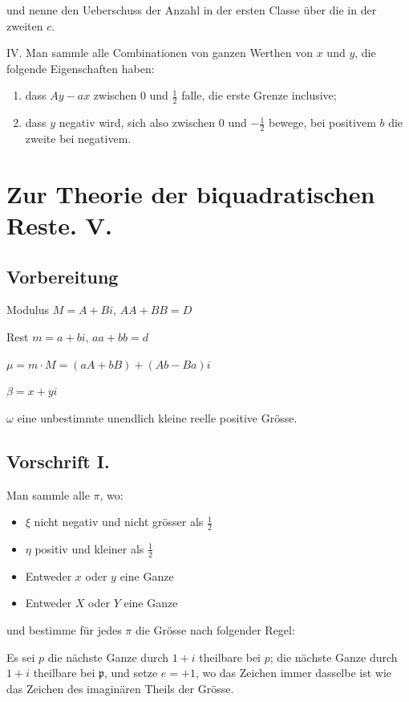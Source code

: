 \documentclass[12pt,a4paper]{article}
\begin{document}
und nenne den Ueberschuss der Anzahl in der ersten Classe über die in der zweiten $c$.

IV. Man sammle alle Combinationen von ganzen Werthen von $x$ und $y$, die folgende Eigenschaften haben:
\begin{enumerate}
\item dass $Ay - ax$ zwischen $0$ und $\frac{1}{2}$ falle, die erste Grenze inclusive;
\item dass $y$ negativ wird, sich also zwischen $0$ und $-\frac{1}{2}$ bewege, bei positivem $b$ die zweite bei negativem.
\end{enumerate}


\section*{Zur Theorie der biquadratischen Reste. V.}

\subsection*{Vorbereitung}

Modulus $M = A + Bi$, $AA + BB = D$

Rest $m = a + bi$, $aa + bb = d$

$\mu = m \cdot M = (aA + bB) + (Ab - Ba)i$

$\beta = x + yi$

$\omega$ eine unbestimmte unendlich kleine reelle positive Grösse.

\subsection*{Vorschrift I.}

Man sammle alle $\pi$, wo:
\begin{itemize}
\item $\xi$ nicht negativ und nicht grösser als $\frac{1}{2}$
\item $\eta$ positiv und kleiner als $\frac{1}{2}$
\item Entweder $x$ oder $y$ eine Ganze
\item Entweder $X$ oder $Y$ eine Ganze
\end{itemize}
und bestimme für jedes $\pi$ die Grösse nach folgender Regel:

Es sei $p$ die nächste Ganze durch $1+i$ theilbare bei $p$; die nächste Ganze durch $1+i$ theilbare bei $\mathfrak{p}$, und setze $e = +1$, wo das Zeichen immer dasselbe ist wie das Zeichen des imaginären Theils der Grösse.
\end{document}
